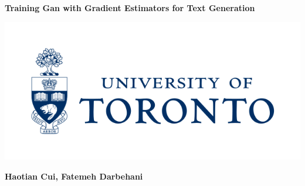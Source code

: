 \documentclass[12pt]{report}
\begin{document}
\begin{titlepage}
\begin{center}
        \vspace*{0.1cm}
        \LARGE %
        \textbf{ Training Gan with Gradient Estimators for Text Generation }
        \newline
        \begin{center}
        \includegraphics[width=.750\textwidth]{Image/UofT_logo.png}
        \newline
        \vspace{0.5cm}
        \end{center}
        \large
        \vfill
        \begin{center}
        \textbf{Haotian Cui,
        Fatemeh Darbehani} %
        \end{center}
        \vfill
        \begin{flushleft}
        
        
        \end{flushleft}
\end{center}
\end{titlepage}
\end{document}
